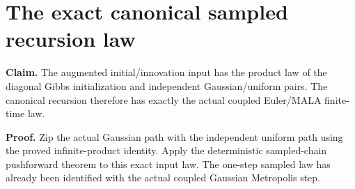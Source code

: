 \documentclass[11pt,a4paper]{article}
\begin{document}
\section{\texorpdfstring{The exact canonical sampled recursion law}{The exact canonical sampled recursion law}}


\textbf{Claim.} The augmented initial/\allowbreak{}innovation input has the product law of the diagonal Gibbs initialization and independent Gaussian/\allowbreak{}uniform pairs. The canonical recursion therefore has exactly the actual coupled Euler/\allowbreak{}MALA finite-time law.



\textbf{Proof.} Zip the actual Gaussian path with the independent uniform path using the proved infinite-product identity. Apply the deterministic sampled-chain pushforward theorem to this exact input law. The one-step sampled law has already been identified with the actual coupled Gaussian Metropolis step.
\end{document}
